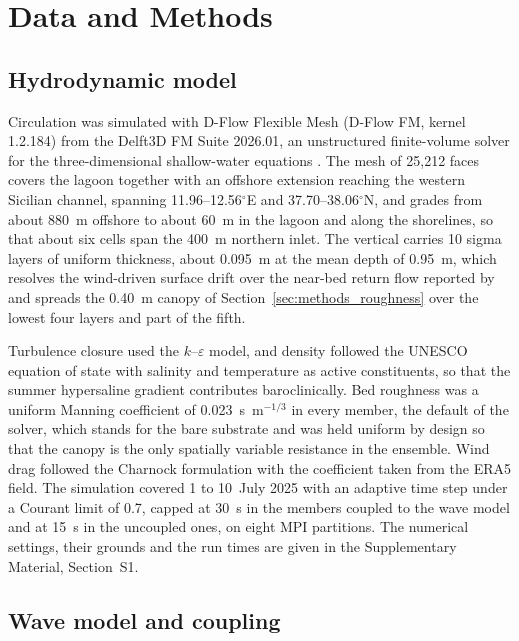 \section{Data and Methods}
\label{sec:data_methods}

\subsection{Hydrodynamic model}
\label{sec:methods_model}

Circulation was simulated with D-Flow Flexible Mesh (D-Flow FM, kernel
1.2.184) from the Delft3D FM Suite 2026.01, an unstructured finite-volume
solver for the three-dimensional shallow-water equations \citep{Kernkamp2011}.
The mesh of 25{,}212 faces covers the lagoon together with an offshore
extension reaching the western Sicilian channel, spanning 11.96--12.56$^\circ$E
and 37.70--38.06$^\circ$N, and grades from about 880~m offshore to about 60~m
in the lagoon and along the shorelines, so that about six cells span the 400~m
northern inlet. The vertical carries 10 sigma layers of uniform thickness,
about 0.095~m at the mean depth of 0.95~m, which resolves the wind-driven
surface drift over the near-bed return flow reported by \citet{DeMarchis2012}
and spreads the 0.40~m canopy of Section~\ref{sec:methods_roughness} over the
lowest four layers and part of the fifth.

Turbulence closure used the $k$--$\varepsilon$ model, and density followed the
UNESCO equation of state with salinity and temperature as active constituents,
so that the summer hypersaline gradient contributes baroclinically. Bed
roughness was a uniform Manning coefficient of 0.023~s~m$^{-1/3}$ in every
member, the default of the solver, which stands for the bare substrate and was
held uniform by design so that the canopy is the only spatially variable
resistance in the ensemble. Wind drag followed the Charnock formulation with
the coefficient taken from the ERA5 field. The simulation covered 1 to
10~July 2025 with an adaptive time step under a Courant limit of 0.7, capped at
30~s in the members coupled to the wave model and at 15~s in the uncoupled ones,
on eight MPI partitions. The numerical settings, their grounds and the run
times are given in the Supplementary Material, Section~S1.

\subsection{Wave model and coupling}
\label{sec:methods_waves}

